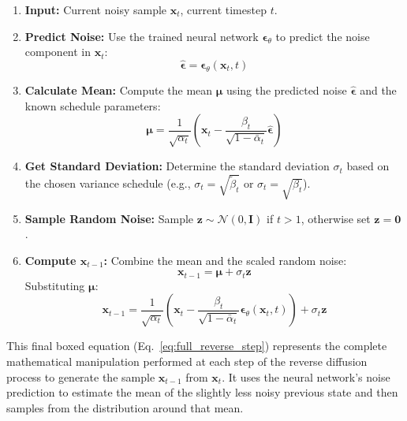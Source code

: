 \documentclass{article}
\newcommand{\bz}{\bm{z}}
\newcommand{\bx}{\bm{x}}
\newcommand{\bmu}{\bm{\mu}}
\newcommand{\bepsilon}{\bm{\epsilon}}
\newcommand{\bI}{\mathbf{I}}
\begin{document}
\begin{enumerate}
    \item \textbf{Input:} Current noisy sample $\bx_t$, current timestep $t$.
    \item \textbf{Predict Noise:} Use the trained neural network $\bepsilon_\theta$ to predict the noise component in $\bx_t$:
        \begin{equation*}
            \hat{\bepsilon} = \bepsilon_\theta(\bx_t, t)
        \end{equation*}
    \item \textbf{Calculate Mean:} Compute the mean $\bmu$ using the predicted noise $\hat{\bepsilon}$ and the known schedule parameters:
        \begin{equation*}
            \bmu = \frac{1}{\sqrt{\alpha_t}} \left( \bx_t - \frac{\beta_t}{\sqrt{1 - \bar{\alpha}_t}} \hat{\bepsilon} \right)
        \end{equation*}
    \item \textbf{Get Standard Deviation:} Determine the standard deviation $\sigma_t$ based on the chosen variance schedule (e.g., $\sigma_t = \sqrt{\tilde{\beta}_t}$ or $\sigma_t = \sqrt{\beta_t}$).
    \item \textbf{Sample Random Noise:} Sample $\bz \sim \mathcal{N}(0, \bI)$ if $t > 1$, otherwise set $\bz = \mathbf{0}$.
    \item \textbf{Compute $\bx_{t-1}$:} Combine the mean and the scaled random noise:
        \begin{equation*}
             \bx_{t-1} = \bmu + \sigma_t \bz
        \end{equation*}
        Substituting $\bmu$:
        \begin{equation} \label{eq:full_reverse_step}
             \boxed{\bx_{t-1} = \frac{1}{\sqrt{\alpha_t}} \left( \bx_t - \frac{\beta_t}{\sqrt{1 - \bar{\alpha}_t}} \bepsilon_\theta(\bx_t, t) \right) + \sigma_t \bz}
        \end{equation}
\end{enumerate}
This final boxed equation (Eq.~\ref{eq:full_reverse_step}) represents the complete mathematical manipulation performed at each step of the reverse diffusion process to generate the sample $\bx_{t-1}$ from $\bx_t$. It uses the neural network's noise prediction to estimate the mean of the slightly less noisy previous state and then samples from the distribution around that mean.




\end{document}
